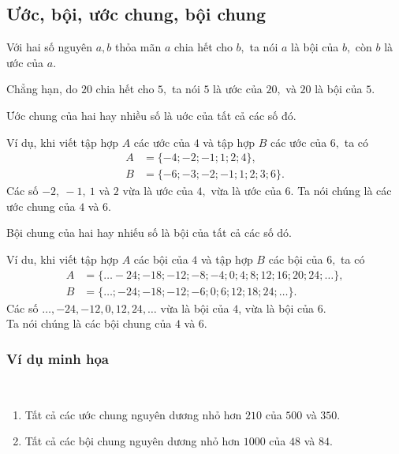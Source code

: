 \subsection{Ước, bội, ước chung, bội chung}
\begin{dx}
Với hai số nguyên $a,b$ thỏa mãn $a$ chia hết cho $b,$ ta nói $a$ là bội của $b,$ còn $b$ là ước của $a.$
\end{dx}
Chẳng hạn, do $20$ chia hết cho $5,$ ta nói $5$ là ước của $20,$ và $20$ là bội của $5.$

\begin{dx}
Ước chung của hai hay nhiều số là uớc của tất cả các số đó.
\end{dx}
Ví dụ, khi viết tập hợp $A$ các ước của $4$ và tập hợp $B$ các ước của $6,$ ta có
$$
\begin{aligned}
A&=\{-4;-2;-1;1 ; 2 ; 4\}, \\
B&=\{-6;-3;-2;-1;1 ; 2 ; 3 ; 6\}.
\end{aligned}
$$
Các số $-2,\ -1,\ 1$ và $2$ vừa là ước của $4,$ vừa là ước của $6.$ Ta nói chúng là các ước chung của $4$ và $6.$

\begin{dx}
Bội chung của hai hay nhiếu số là bội của tất cả các số dó.
\end{dx}
Ví du, khi viết tập hợp $A$ các bội của $4$ và tập hợp $B$ các bội của $6,$ ta có
\begin{align*}
    A&=\{\ldots-24;-18;-12;-8;-4;0;4;8;12;16;20;24;\ldots\},\\
    B&=\{\ldots;-24;-18;-12;-6;0;6;12;18;24;\ldots\}.
\end{align*}
Các số $\ldots,-24,-12,0,12,24, \ldots$ vừa là bội của $4$, vừa là bội của $6.$\\ Ta nói chúng là các bội chung của $4$ và $6.$
\subsubsection*{Ví dụ minh họa}

\begin{bx} \
\begin{enumerate}[a,]
    \item Tất cả các ước chung nguyên dương nhỏ hơn $210$ của $500$ và $350$.
    \item Tất cả các bội chung nguyên dương nhỏ hơn $1000$ của $48$ và $84$.
\end{enumerate}
\end{bx}

